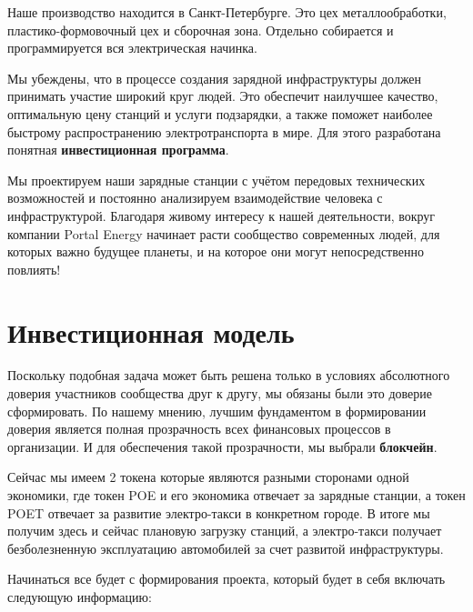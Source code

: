 \documentclass[a4paper,12pt]{report}
\begin{document}
Наше производство находится в Санкт-Петербурге. Это цех металлообработки, пластико-формовочный цех и сборочная зона. Отдельно собирается и программируется вся электрическая начинка.

Мы убеждены, что в процессе создания зарядной инфраструктуры должен принимать участие широкий круг людей. Это обеспечит наилучшее качество, оптимальную цену станций и услуги подзарядки, а также поможет наиболее быстрому распространению электротранспорта в мире. Для этого разработана понятная \textbf{инвестиционная программа}.

Мы проектируем наши зарядные станции с учётом передовых технических возможностей и постоянно анализируем взаимодействие человека с инфраструктурой. Благодаря живому интересу к нашей деятельности, вокруг компании Portal Energy начинает расти сообщество современных людей, для которых важно будущее планеты, и на которое они могут непосредственно повлиять!

\vspace*{1cm}

\chapter{Инвестиционная модель}
Поскольку подобная задача может быть решена только в условиях абсолютного доверия участников сообщества друг к другу, мы обязаны были это доверие сформировать. По нашему мнению, лучшим фундаментом в формировании доверия является полная прозрачность всех финансовых процессов в организации. И для обеспечения такой прозрачности, мы выбрали \textbf{блокчейн}. 

Сейчас мы имеем 2 токена которые являются разными сторонами одной экономики, где
токен POE и его экономика отвечает за зарядные станции, а токен POET отвечает за развитие электро-такси в конкретном городе. В итоге мы получим здесь и сейчас плановую загрузку станций, а электро-такси получает безболезненную эксплуатацию автомобилей за счет развитой инфраструктуры. 

Начинаться все будет с формирования проекта, который будет в себя включать следующую информацию:
\end{document}
